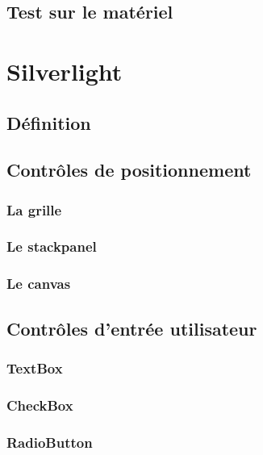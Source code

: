\documentclass[twoside,UTF8]{EPURapport}
\begin{document}
	\section{Test sur le matériel}



\chapter{Silverlight}

	\section{Définition}
	
	
	\section{Contrôles de positionnement}
		\subsection{La grille}
		\subsection{Le stackpanel}
		\subsection{Le canvas}

	\section{Contrôles d'entrée utilisateur}
		\subsection{TextBox}
		\subsection{CheckBox}
		\subsection{RadioButton}
		
\end{document}

